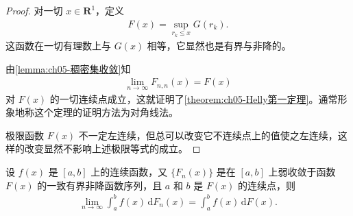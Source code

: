 \documentclass[../../main.tex]{subfiles}
\begin{document}
\begin{proof}
对一切 $x\in\mathbf{R}^{1}$，定义
\begin{align*}
F(x)=\sup_{r_k\leqslant x}G(r_k).
\end{align*}
这函数在一切有理数上与 $G(x)$ 相等，它显然也是有界与非降的。

由\cref{lemma:ch05-稠密集收敛}知
\begin{align}
\lim_{n\to\infty}F_{n,n}(x)=F(x)
\end{align}
对 $F(x)$ 的一切连续点成立，这就证明了\cref{theorem:ch05-Helly第一定理}。通常形象地称这个定理的证明方法为对角线法。

极限函数 $F(x)$ 不一定左连续，但总可以改变它不连续点上的值使之左连续，这样的改变显然不影响上述极限等式的成立。
\end{proof}

\begin{theorem}\label{theorem:ch05-Helly第二定理}
设 $f(x)$ 是 $[a,b]$ 上的连续函数，又 $\{F_n(x)\}$ 是在 $[a,b]$ 上弱收敛于函数 $F(x)$ 的一致有界非降函数序列，且 $a$ 和 $b$ 是 $F(x)$ 的连续点，则
\begin{align}
\lim_{n\to\infty}\int_{a}^{b}f(x)\,\mathrm{d}F_n(x)=\int_{a}^{b}f(x)\,\mathrm{d}F(x).
\end{align}
\end{theorem}
\end{document}
